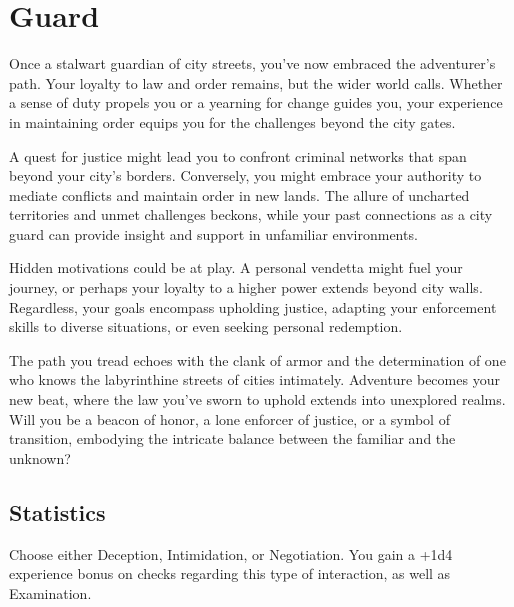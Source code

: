 \section{Guard}\label{background:guard}
Once a stalwart guardian of city streets, you've now embraced the adventurer's path.
Your loyalty to law and order remains, but the wider world calls.
Whether a sense of duty propels you or a yearning for change guides you, your experience in maintaining order equips you for the challenges beyond the city gates.

A quest for justice might lead you to confront criminal networks that span beyond your city's borders.
Conversely, you might embrace your authority to mediate conflicts and maintain order in new lands.
The allure of uncharted territories and unmet challenges beckons, while your past connections as a city guard can provide insight and support in unfamiliar environments.

Hidden motivations could be at play.
A personal vendetta might fuel your journey, or perhaps your loyalty to a higher power extends beyond city walls.
Regardless, your goals encompass upholding justice, adapting your enforcement skills to diverse situations, or even seeking personal redemption.

The path you tread echoes with the clank of armor and the determination of one who knows the labyrinthine streets of cities intimately.
Adventure becomes your new beat, where the law you've sworn to uphold extends into unexplored realms.
Will you be a beacon of honor, a lone enforcer of justice, or a symbol of transition, embodying the intricate balance between the familiar and the unknown?

\subsection{Statistics}
Choose either Deception, Intimidation, or Negotiation.
You gain a +1d4 experience bonus on checks regarding this type of interaction, as well as Examination.

